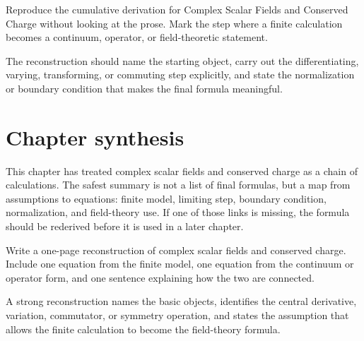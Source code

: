 \begin{exercise}
Reproduce the cumulative derivation for Complex Scalar Fields and Conserved Charge without looking at the prose.  Mark the step where a finite calculation becomes a continuum, operator, or field-theoretic statement.
\begin{answer}
The reconstruction should name the starting object, carry out the differentiating, varying, transforming, or commuting step explicitly, and state the normalization or boundary condition that makes the final formula meaningful.
\end{answer}
\end{exercise}



\section{Chapter synthesis}

This chapter has treated complex scalar fields and conserved charge as a chain of calculations.  The safest summary is not a list of final formulas, but a map from assumptions to equations: finite model, limiting step, boundary condition, normalization, and field-theory use.  If one of those links is missing, the formula should be rederived before it is used in a later chapter.

\begin{exercise}
Write a one-page reconstruction of complex scalar fields and conserved charge.  Include one equation from the finite model, one equation from the continuum or operator form, and one sentence explaining how the two are connected.
\begin{answer}
A strong reconstruction names the basic objects, identifies the central derivative, variation, commutator, or symmetry operation, and states the assumption that allows the finite calculation to become the field-theory formula.
\end{answer}
\end{exercise}
